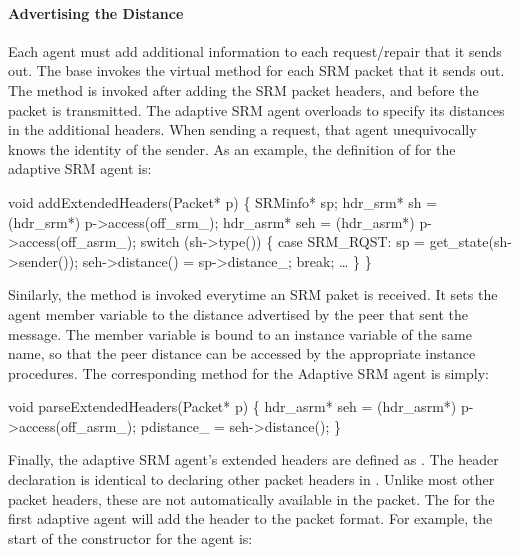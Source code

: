 {\paragraph{Advertising the Distance}
Each agent must add additional information to each request/repair
that it sends out.
The base 
invokes the virtual method
for each SRM packet that it sends out.
The method is invoked after adding the SRM packet headers, and
before the packet is transmitted.
The adaptive SRM agent overloads 
to specify its distances in the additional headers.
When sending a request, that agent unequivocally knows the
identity of the sender.
As an example, the definition of
 for the adaptive SRM agent is:
\begin{program}
        void addExtendedHeaders(Packet* p) \{
                SRMinfo* sp;
                hdr_srm*  sh = (hdr_srm*) p->access(off_srm_);
                hdr_asrm* seh = (hdr_asrm*) p->access(off_asrm_);
                switch (sh->type()) \{
                case SRM_RQST:
                        sp = get_state(sh->sender());
                        seh->distance() = sp->distance_;
                        break;
                \ldots
                \}
        \}
\end{program}


Sinilarly, the method
is invoked everytime an SRM paket is received.
It sets the agent member variable 
to the distance advertised by the peer that sent the message.
The member variable is bound to an instance variable of the same name,
so that the peer distance can be accessed
by the appropriate instance procedures.
The corresponding  method for the
Adaptive SRM agent is simply:
\begin{program}
        void parseExtendedHeaders(Packet* p) \{
                hdr_asrm* seh = (hdr_asrm*) p->access(off_asrm_);
                pdistance_ = seh->distance();
        \}
\end{program}


Finally, the adaptive SRM agent's extended headers are defined as
.
The header declaration is identical to declaring other packet headers in \ns.
Unlike most other packet headers, 
these are not automatically available in the packet.
The
for the first adaptive agent
will add the header to the packet format.
For example, the start of the constructor for the
 agent is:
}
